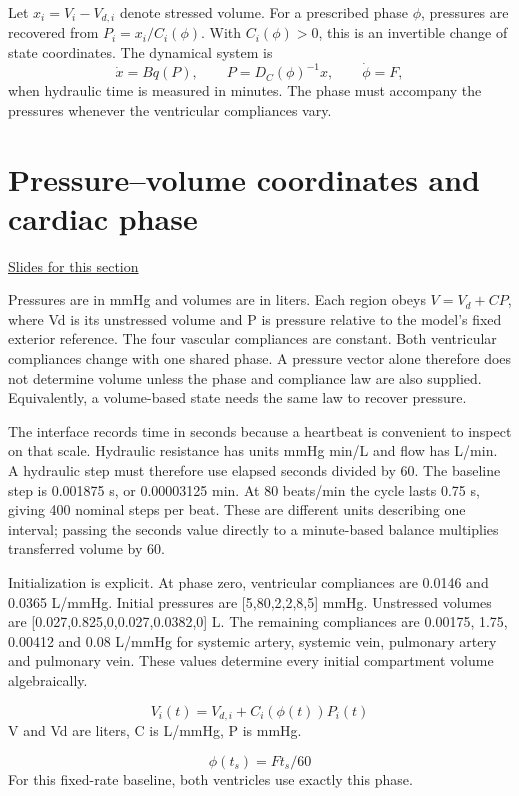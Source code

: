 \documentclass[11pt,letterpaper]{article}
\theoremstyle{definition}\newtheorem{definition}{Definition}\newtheorem{example}{Example}
\numberwithin{equation}{section}
\begin{document}
Let $x_i=V_i-V_{d,i}$ denote stressed volume. For a prescribed phase $\phi$, pressures are recovered from $P_i=x_i/C_i(\phi)$. With $C_i(\phi)>0$, this is an invertible change of state coordinates. The dynamical system is
\[
 \dot x=Bq(P),\qquad P=D_C(\phi)^{-1}x,\qquad \dot\phi=F,
\]
when hydraulic time is measured in minutes. The phase must accompany the pressures whenever the ventricular compliances vary.
\section{Pressure--volume coordinates and cardiac phase}
\hypertarget{note-pressure-volume-coordinates-and-cardiac-phase}{}\label{note:pressure-volume-coordinates-and-cardiac-phase}
{\small \href{slides.html\#frame=stored-volumes-as-state-variables\&step=1}{Slides for this section}}\par
Pressures are in mmHg and volumes are in liters. Each region obeys $V=V_d+CP$, where Vd is its unstressed volume and P is pressure relative to the model's fixed exterior reference. The four vascular compliances are constant. Both ventricular compliances change with one shared phase. A pressure vector alone therefore does not determine volume unless the phase and compliance law are also supplied. Equivalently, a volume-based state needs the same law to recover pressure.

The interface records time in seconds because a heartbeat is convenient to inspect on that scale. Hydraulic resistance has units mmHg min/L and flow has L/min. A hydraulic step must therefore use elapsed seconds divided by 60. The baseline step is 0.001875 s, or 0.00003125 min. At 80 beats/min the cycle lasts 0.75 s, giving 400 nominal steps per beat. These are different units describing one interval; passing the seconds value directly to a minute-based balance multiplies transferred volume by 60.

Initialization is explicit. At phase zero, ventricular compliances are 0.0146 and 0.0365 L/mmHg. Initial pressures are [5,80,2,2,8,5] mmHg. Unstressed volumes are [0.027,0.825,0,0.027,0.0382,0] L. The remaining compliances are 0.00175, 1.75, 0.00412 and 0.08 L/mmHg for systemic artery, systemic vein, pulmonary artery and pulmonary vein. These values determine every initial compartment volume algebraically.

\[
V_i(t)=V_{d,i}+C_i(\phi(t))P_i(t)
\]
V and Vd are liters, C is L/mmHg, P is mmHg.

\[
\phi(t_s)=F t_s/60
\]
For this fixed-rate baseline, both ventricles use exactly this phase.
\end{document}
